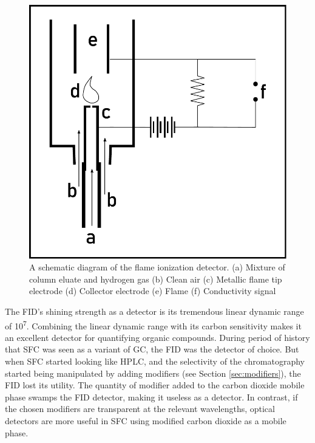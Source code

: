 \begin{figure}
\centering
\includegraphics[width=\textwidth]{Figures/FIDSchematic.pdf}
\decoRule

\caption[FID diagram]{A schematic diagram of the flame ionization detector. (a)
Mixture of column eluate and hydrogen gas (b) Clean air (c) Metallic flame tip
electrode (d) Collector electrode (e) Flame (f) Conductivity signal}

\label{fig:fiddiagram}

\end{figure}

The FID's shining strength as a detector is its tremendous linear dynamic range
of 10\textsuperscript{7}. Combining the linear dynamic range with its carbon
sensitivity makes it an excellent detector for quantifying organic compounds.
During period of history that SFC was seen as a variant of GC, the FID was the
detector of choice. But when SFC started looking like HPLC, and the selectivity
of the chromatography started being manipulated by adding modifiers (see Section
\ref{sec:modifiers}), the FID lost its utility. The quantity of modifier added
to the carbon dioxide mobile phase swamps the FID detector, making it useless as
a detector. In contrast, if the chosen modifiers are transparent at the relevant
wavelengths, optical detectors are more useful in SFC using modified carbon
dioxide as a mobile phase.

